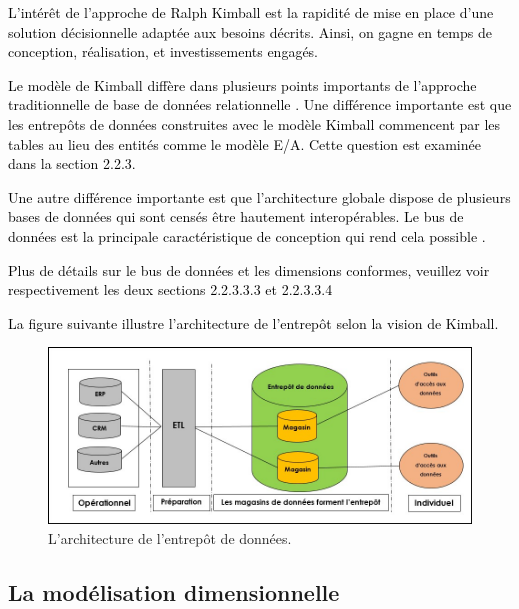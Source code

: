 \documentclass[a4paper,12pt]{report}
\begin{document}
\textcolor{black}{L’intérêt de l’approche de Ralph Kimball est la rapidité de mise en place d’une solution décisionnelle adaptée aux besoins décrits. Ainsi, on gagne en temps de conception, réalisation, et investissements engagés. }

\textcolor{black}{Le modèle de Kimball diffère dans plusieurs points importants de l’approche traditionnelle de base de données relationnelle \citep{breslin2004data}. Une différence importante est que les entrepôts de données construites avec le modèle Kimball commencent par les tables au lieu des entités comme le modèle E/A. Cette question est examinée dans la section 2.2.3. }

\textcolor{black}{Une autre différence importante est que l'architecture globale dispose de plusieurs bases de données qui sont censés être hautement interopérables. Le bus de données est la principale caractéristique de conception qui rend cela possible  \citep{breslin2004data}.}

\textcolor{black}{
Plus de détails sur le bus de données et les dimensions conformes, veuillez voir respectivement les deux sections 2.2.3.3.3 et 2.2.3.3.4
}

\textcolor{black}{La figure suivante illustre l'architecture de l'entrepôt selon la vision de Kimball.} 

\begin{figure}[H]
\begin{center}
\includegraphics[width=1\linewidth]{./images/10bis}
\end{center}

\caption{L'architecture de l'entrepôt de données.}
\label{fig:23}

\end{figure}

\subsection{La modélisation dimensionnelle}
\end{document}
